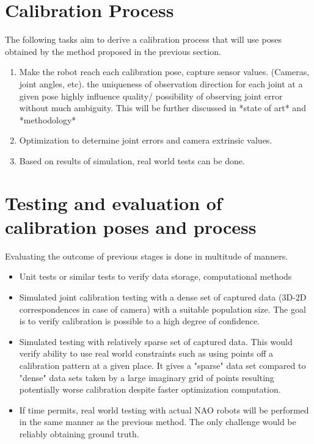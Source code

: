 \documentclass[english, printversion, nomenclature, notitle]{tuvisionthesis} %
\begin{document}
\section{Calibration Process}
The following tasks aim to derive a calibration process that will use poses obtained by the method proposed in the previous section.

\begin{enumerate}
	\item Make the robot reach each calibration pose, capture sensor values. (Cameras, joint angles, etc).
	\subitem the uniqueness of observation direction for each joint at a given pose highly influence quality/ possibility of observing joint error without much ambiguity. This will be further discussed in *state of art* and *methodology*
	\item Optimization to determine joint errors and camera extrinsic values.
	\item Based on results of simulation, real world tests can be done.
\end{enumerate}

\section{Testing and evaluation of calibration poses and process}

Evaluating the outcome of previous stages is done in multitude of manners.

\begin{itemize}
	\item Unit tests or similar tests to verify data storage, computational methods
	\item Simulated joint calibration testing with a dense set of captured data (3D-2D correspondences in case of camera) with a suitable population size.
	\subitem The goal is to verify calibration is possible to a high degree of confidence.
	\item Simulated testing with relatively sparse set of captured data. This would verify ability to use real world constraints such as using points off a calibration pattern at a given place. It gives a "sparse" data set compared to "dense" data sets taken by a large imaginary grid of points resulting potentially worse calibration despite faster optimization computation.
	\item If time permits, real world testing with actual NAO robots will be performed in the same manner as the previous method. The only challenge would be reliably obtaining ground truth.
\end{itemize}
\end{document}
